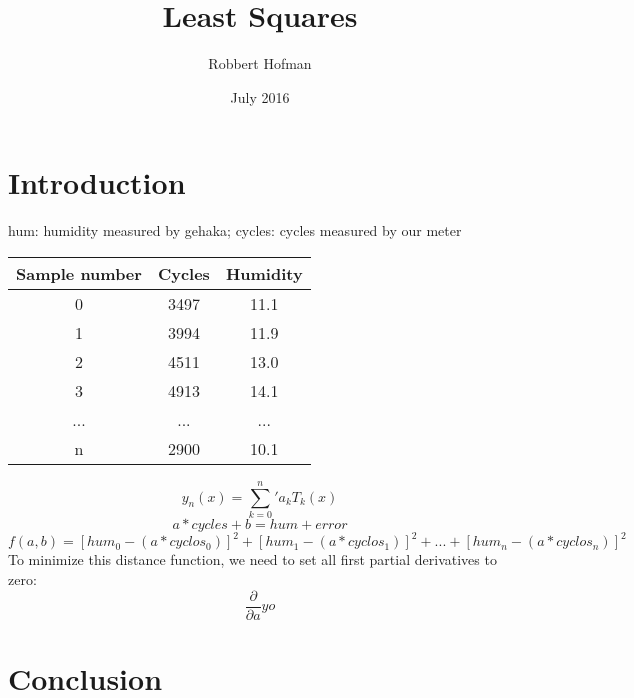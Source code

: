 \documentclass{article}
\title{Least Squares}
\author{Robbert Hofman}
\date{July 2016}
\begin{document}
\maketitle

\section{Introduction}
hum: humidity measured by gehaka; cycles: cycles measured by our meter

\begin{center}
\begin{tabular}{ c c c }
\hline
 Sample number & Cycles & Humidity \\ 
\hline
 0 & 3497 & 11.1  \\  
 1 & 3994 & 11.9 \\
 2 & 4511 & 13.0 \\
 3 & 4913 & 14.1 \\ 
 ... & ... & ... \\ 
 n & 2900 & 10.1
\end{tabular}
\end{center}

$$y_n(x) = \sum_{k=0}^n {'} a_k T_k(x)$$
$$a*cycles + b = hum + error$$
$$f(a,b) = [hum_{0} - (a*cyclos_{0})]^{2} + [hum_{1} - (a*cyclos_{1})]^{2} + ... +  [hum_{n} - (a*cyclos_{n})]^{2}$$
To minimize this distance function, we need to set all first partial derivatives to zero:
$$\frac{\partial}{\partial a}yo$$

\section{Conclusion}




\end{document}
